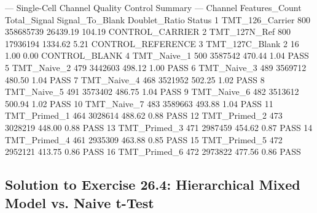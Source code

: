 \documentclass[11pt,twoside,openright]{book}
\begin{document}
\begin{routput}
--- Single-Cell Channel Quality Control Summary ---
           Channel Features\_Count Total\_Signal Signal\_To\_Blank Doublet\_Ratio            Status
1  TMT\_126\_Carrier            800    358685739        26439.19        104.19   CONTROL\_CARRIER
2     TMT\_127N\_Ref            800     17936194         1334.62          5.21 CONTROL\_REFERENCE
3   TMT\_127C\_Blank              2           16            1.00          0.00     CONTROL\_BLANK
4      TMT\_Naive\_1            500      3587542          470.44          1.04              PASS
5      TMT\_Naive\_2            479      3442603          498.12          1.00              PASS
6      TMT\_Naive\_3            489      3569712          480.50          1.04              PASS
7      TMT\_Naive\_4            468      3521952          502.25          1.02              PASS
8      TMT\_Naive\_5            491      3573402          486.75          1.04              PASS
9      TMT\_Naive\_6            482      3513612          500.94          1.02              PASS
10     TMT\_Naive\_7            483      3589663          493.88          1.04              PASS
11    TMT\_Primed\_1            464      3028614          488.62          0.88              PASS
12    TMT\_Primed\_2            473      3028219          448.00          0.88              PASS
13    TMT\_Primed\_3            471      2987459          454.62          0.87              PASS
14    TMT\_Primed\_4            461      2935309          463.88          0.85              PASS
15    TMT\_Primed\_5            472      2952121          413.75          0.86              PASS
16    TMT\_Primed\_6            472      2973822          477.56          0.86              PASS
\end{routput}

\subsection{Solution to Exercise 26.4: Hierarchical Mixed Model vs. Naive t-Test}
\label{sec:sol_26_4}
\end{document}
